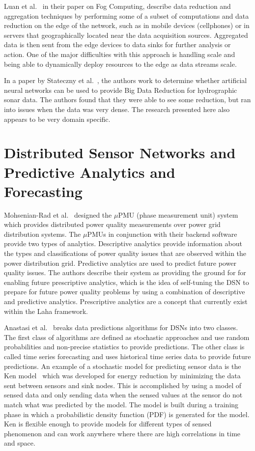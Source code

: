 Luan et al.~\cite{luan2015fog} in their paper on Fog Computing, describe data reduction and aggregation techniques by performing some of a subset of computations and data reduction on the edge of the network, such as in mobile devices (cellphones) or in servers that geographically located near the data acquisition sources. Aggregated data is then sent from the edge devices to data sinks for further analysis or action. One of the major difficulties with this approach is handling scale and being able to dynamically deploy resources to the edge as data streams scale.

In a paper by Stateczny et al.~\cite{stateczny2014self}, the authors work to determine whether artificial neural networks can be used to provide Big Data Reduction for hydrographic sonar data. The authors found that they were able to see some reduction, but ran into issues when the data was very dense. The research presented here also appears to be very domain specific.

\section{Distributed Sensor Networks and Predictive Analytics and Forecasting}\label{sec:distributed-sensor-networks-and-predictive-analytics-and-forecasting}

Mohsenian-Rad et al.~\cite{mohsenian2018distribution} designed the $\mu$PMU (phase measurement unit) system which provides distributed power quality measurements over power grid distribution systems. The $\mu$PMUs in conjunction with their backend software provide two types of analytics. Descriptive analytics provide information about the types and classifications of power quality issues that are observed within the power distribution grid. Predictive analytics are used to predict future power quality issues. The authors describe their system as providing the ground for for enabling future prescriptive analytics, which is the idea of self-tuning the DSN to prepare for future power quality problems by using a combination of descriptive and predictive analytics. Prescriptive analytics are a concept that currently exist within the Laha framework.

Anastasi et al.~\cite{anastasi_energy_2009} breaks data predictions algorithms for DSNs into two classes. The first class of algorithms are defined as stochastic approaches and use random probabilities and non-precise statistics to provide predictions. The other class is called time series forecasting and uses historical time series data to provide future predictions. An example of a stochastic model for predicting sensor data is the Ken model~\cite{chu2006approximate} which was developed for energy reduction by minimizing the data sent between sensors and sink nodes. This is accomplished by using a model of sensed data and only sending data when the sensed values at the sensor do not match what was predicted by the model. The model is built during a training phase in which a probabilistic density function (PDF) is generated for the model. Ken is flexible enough to provide models for different types of sensed phenomenon and can work anywhere where there are high correlations in time and space.

